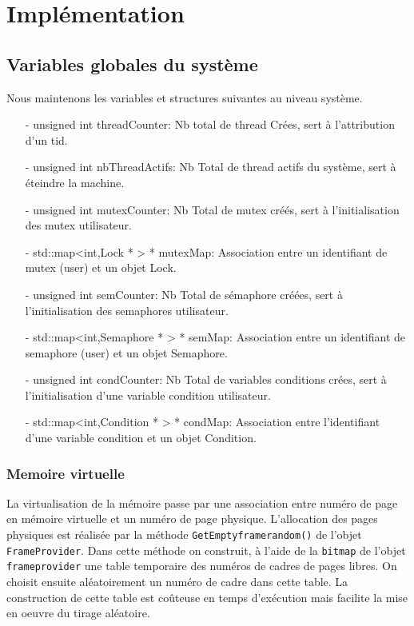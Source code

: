 \documentclass[11pt]{article}
\begin{document}
\section{Implémentation}

\subsection{Variables globales du système}
Nous maintenons les variables et structures suivantes au niveau système.
\begin{itemize}
\item[-] unsigned int threadCounter: Nb total de thread Crées, sert à l'attribution d'un tid.
\item[-] unsigned int nbThreadActifs: Nb Total de thread actifs du système, sert à éteindre la machine.
\item[-] unsigned int mutexCounter: Nb Total de mutex créés, sert à l'initialisation des mutex utilisateur.
\item[-] std::map<int,Lock * > * mutexMap: Association entre un identifiant de mutex (user) et un objet Lock.
\item[-] unsigned int semCounter: Nb Total de sémaphore créées, sert à l'initialisation des semaphores utilisateur.
\item[-] std::map<int,Semaphore * > * semMap: Association entre un identifiant de semaphore (user) et un objet Semaphore.
\item[-] unsigned int condCounter: Nb Total de variables conditions crées, sert à l'initialisation d'une variable
  condition utilisateur.
\item[-] std::map<int,Condition * > * condMap: Association entre l'identifiant d'une variable condition et
  un objet Condition.
\end{itemize}

\subsubsection{Memoire virtuelle}
La virtualisation de la mémoire passe par une association entre numéro de page en mémoire virtuelle
et un numéro de page physique. L'allocation des pages physiques est réalisée par la méthode \texttt{GetEmptyframerandom()} de l'objet \texttt{FrameProvider}.
Dans cette méthode on construit, à l'aide de la \texttt{bitmap} de l'objet \texttt{frameprovider} une table temporaire des numéros de cadres de pages libres.
On choisit ensuite aléatoirement un numéro de cadre dans cette table. La construction de cette table est coûteuse
en temps d'exécution mais facilite la mise en oeuvre du tirage aléatoire.
\end{document}
